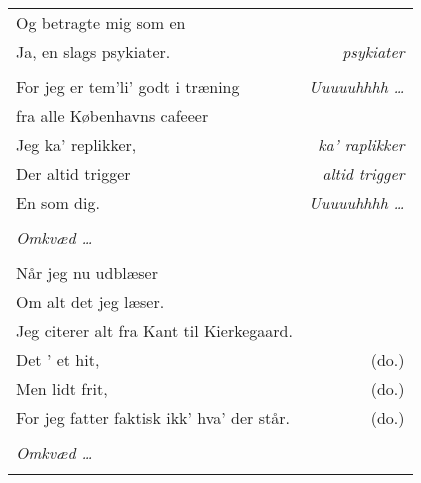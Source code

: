 \documentclass[danish]{article}
\begin{document}
\begin{tabular}{lr}
Og betragte mig som en  & \\
Ja, en slags psykiater. & \em{psykiater}\\
 & \\
For jeg er tem'li' godt i træning & \em{Uuuuuhhhh \ldots}\\
\hspace{1cm}fra alle Københavns cafeeer & \\
Jeg ka' replikker, & \em{ka' raplikker}\\
Der altid trigger & \em{altid trigger}\\
En som dig. & \em{Uuuuuhhhh \ldots}\\
 & \\
\em{Omkvæd \ldots} & \\
 & \\
Når jeg nu udblæser & \\
Om alt det jeg læser. & \\
Jeg citerer alt fra Kant til Kierkegaard. & \\
Det ' et hit, & (do.)\\
Men lidt frit, & (do.)\\
For jeg fatter faktisk ikk' hva' der står. & (do.)\\
 & \\
\em{Omkvæd \ldots} & \\
 & \\
\end{tabular}
\end{document}
